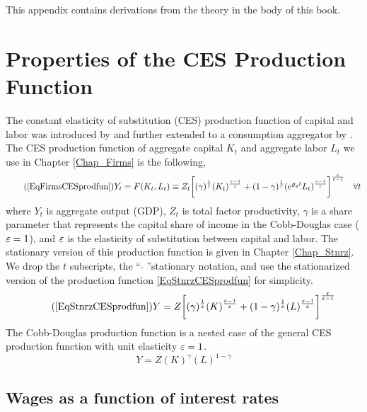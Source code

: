 
This appendix contains derivations from the theory in the body of this book.


\section{Properties of the CES Production Function}\label{SecAppDerivCES}

  The constant elasticity of substitution (CES) production function of capital and labor was introduced by \citet{Solow:1956} and further extended to a consumption aggregator by \citet{Armington:1969}. The CES production function of aggregate capital $K_t$ and aggregate labor $L_t$ we use in Chapter \ref{Chap_Firms} is the following,
  \begin{equation}\tag{\ref{EqFirmsCESprodfun}}
    Y_t = F(K_t, L_t) \equiv Z_t\biggl[(\gamma)^\frac{1}{\ve}(K_t)^\frac{\ve-1}{\ve} + (1-\gamma)^\frac{1}{\ve}(e^{g_y t}L_t)^\frac{\ve-1}{\ve}\biggr]^\frac{\ve}{\ve-1} \quad\forall t
  \end{equation}
  where $Y_t$ is aggregate output (GDP), $Z_t$ is total factor productivity, $\gamma$ is a share parameter that represents the capital share of income in the Cobb-Douglas case ($\varepsilon=1$), and $\varepsilon$ is the elasticity of substitution between capital and labor. The stationary version of this production function is given in Chapter \ref{Chap_Stnrz}. We drop the $t$ subscripts, the ``$\:\hat{\,}\:$''stationary notation, and use the stationarized version of the production function \eqref{EqStnrzCESprodfun} for simplicity.
  \begin{equation}\tag{\ref{EqStnrzCESprodfun}}
    Y =  Z\biggl[(\gamma)^\frac{1}{\ve}(K)^\frac{\ve-1}{\ve} + (1-\gamma)^\frac{1}{\ve}(L)^\frac{\ve-1}{\ve}\biggr]^\frac{\ve}{\ve-1}
  \end{equation}
  The Cobb-Douglas production function is a nested case of the general CES production function with unit elasticity $\varepsilon=1$.
  \begin{equation}\label{EqAppDerivCES_CobbDoug}
    Y = Z(K)^\gamma(L)^{1-\gamma}
  \end{equation}



  \subsection{Wages as a function of interest rates}\label{SecAppDerivCESwr}

